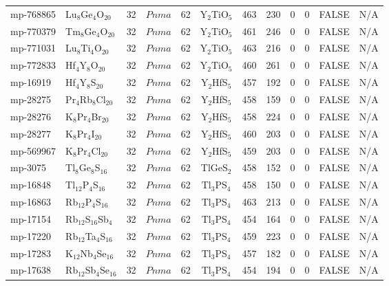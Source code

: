 {\begin{longtable}{llcccccccccc}
    mp-768865 & Lu$_{8}$Ge$_{4}$O$_{20}$ & 32    & $Pnma$ & 62    & Y$_{2}$TiO$_{5}$ & 463   & 230   & 0     & 0     & FALSE & N/A \\
    mp-770379 & Tm$_{8}$Ge$_{4}$O$_{20}$ & 32    & $Pnma$ & 62    & Y$_{2}$TiO$_{5}$ & 461   & 246   & 0     & 0     & FALSE & N/A \\
    mp-771031 & Lu$_{8}$Ti$_{4}$O$_{20}$ & 32    & $Pnma$ & 62    & Y$_{2}$TiO$_{5}$ & 463   & 216   & 0     & 0     & FALSE & N/A \\
    mp-772833 & Hf$_{4}$Y$_{8}$O$_{20}$ & 32    & $Pnma$ & 62    & Y$_{2}$TiO$_{5}$ & 460   & 261   & 0     & 0     & FALSE & N/A \\
    mp-16919 & Hf$_{4}$Y$_{8}$S$_{20}$ & 32    & $Pnma$ & 62    & Y$_{2}$HfS$_{5}$ & 457   & 192   & 0     & 0     & FALSE & N/A \\
    mp-28275 & Pr$_{4}$Rb$_{8}$Cl$_{20}$ & 32    & $Pnma$ & 62    & Y$_{2}$HfS$_{5}$ & 458   & 159   & 0     & 0     & FALSE & N/A \\
    mp-28276 & K$_{8}$Pr$_{4}$Br$_{20}$ & 32    & $Pnma$ & 62    & Y$_{2}$HfS$_{5}$ & 458   & 224   & 0     & 0     & FALSE & N/A \\
    mp-28277 & K$_{8}$Pr$_{4}$I$_{20}$ & 32    & $Pnma$ & 62    & Y$_{2}$HfS$_{5}$ & 460   & 203   & 0     & 0     & FALSE & N/A \\
    mp-569967 & K$_{8}$Pr$_{4}$Cl$_{20}$ & 32    & $Pnma$ & 62    & Y$_{2}$HfS$_{5}$ & 459   & 203   & 0     & 0     & FALSE & N/A \\
    mp-3075 & Tl$_{8}$Ge$_{8}$S$_{16}$ & 32    & $Pnma$ & 62    & TlGeS$_{2}$ & 458   & 152   & 0     & 0     & FALSE & N/A \\
    mp-16848 & Tl$_{12}$P$_{4}$S$_{16}$ & 32    & $Pnma$ & 62    & Tl$_{3}$PS$_{4}$ & 458   & 150   & 0     & 0     & FALSE & N/A \\
    mp-16863 & Rb$_{12}$P$_{4}$S$_{16}$ & 32    & $Pnma$ & 62    & Tl$_{3}$PS$_{4}$ & 463   & 213   & 0     & 0     & FALSE & N/A \\
    mp-17154 & Rb$_{12}$S$_{16}$Sb$_{4}$ & 32    & $Pnma$ & 62    & Tl$_{3}$PS$_{4}$ & 454   & 164   & 0     & 0     & FALSE & N/A \\
    mp-17220 & Rb$_{12}$Ta$_{4}$S$_{16}$ & 32    & $Pnma$ & 62    & Tl$_{3}$PS$_{4}$ & 459   & 223   & 0     & 0     & FALSE & N/A \\
    mp-17283 & K$_{12}$Nb$_{4}$Se$_{16}$ & 32    & $Pnma$ & 62    & Tl$_{3}$PS$_{4}$ & 457   & 182   & 0     & 0     & FALSE & N/A \\
    mp-17638 & Rb$_{12}$Sb$_{4}$Se$_{16}$ & 32    & $Pnma$ & 62    & Tl$_{3}$PS$_{4}$ & 454   & 194   & 0     & 0     & FALSE & N/A \\

\end{longtable}}

